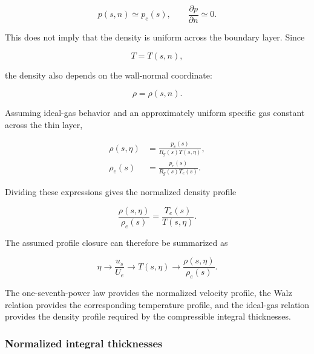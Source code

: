 \begin{equation}
    \boxed{
    p(s,n)\simeq p_e(s)
    },
    \qquad
    \frac{\partial p}{\partial n}\simeq0.
    \label{eq:normal_pressure_uniformity}
\end{equation}

This does not imply that the density is uniform across the boundary layer.
Since

\begin{equation}
    T=T(s,n),
\end{equation}

the density also depends on the wall-normal coordinate:

\begin{equation}
    \rho=\rho(s,n).
\end{equation}

Assuming ideal-gas behavior and an approximately uniform specific gas
constant across the thin layer,

\begin{align}
    \rho(s,\eta)
    &=
    \frac{p_e(s)}
         {R_g(s)T(s,\eta)},
    \\
    \rho_e(s)
    &=
    \frac{p_e(s)}
         {R_g(s)T_e(s)}.
\end{align}

Dividing these expressions gives the normalized density profile

\begin{equation}
    \boxed{
    \frac{\rho(s,\eta)}{\rho_e(s)}
    =
    \frac{T_e(s)}{T(s,\eta)}
    }.
    \label{eq:normalized_density_profile}
\end{equation}

The assumed profile closure can therefore be summarized as

\begin{equation}
    \boxed{
    \eta
    \longrightarrow
    \frac{u_s}{U_e}
    \longrightarrow
    T(s,\eta)
    \longrightarrow
    \frac{\rho(s,\eta)}{\rho_e(s)}
    }.
    \label{eq:profile_closure_sequence}
\end{equation}

The one-seventh-power law provides the normalized velocity profile, the Walz
relation provides the corresponding temperature profile, and the ideal-gas
relation provides the density profile required by the compressible integral
thicknesses.

\subsubsection{Normalized integral thicknesses}

